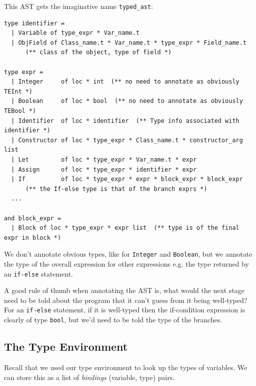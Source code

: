 {{This AST gets the imaginative name \texttt{typed\_ast}:

%

\begin{lstlisting}[caption={typed\_ast.mli},language=caml]
type identifier =
  | Variable of type_expr * Var_name.t
  | ObjField of Class_name.t * Var_name.t * type_expr * Field_name.t
      (** class of the object, type of field *)

type expr =
  | Integer     of loc * int  (** no need to annotate as obviously TEInt *)
  | Boolean     of loc * bool  (** no need to annotate as obviously TEBool *)
  | Identifier  of loc * identifier  (** Type info associated with identifier *)
  | Constructor of loc * type_expr * Class_name.t * constructor_arg list
  | Let         of loc * type_expr * Var_name.t * expr
  | Assign      of loc * type_expr * identifier * expr
  | If          of loc * type_expr * expr * block_expr * block_expr
      (** the If-else type is that of the branch exprs *)
  ...

and block_expr =
  | Block of loc * type_expr * expr list  (** type is of the final expr in block *)
\end{lstlisting}

We don't annotate obvious types, like for \texttt{Integer} and
\texttt{Boolean}, but we annotate the type of the overall expression for
other expressions e.g. the type returned by an \texttt{if-else}
statement.

A good rule of thumb when annotating the AST is, what would the next
stage need to be told about the program that it can't guess from it
being well-typed? For an \texttt{if-else} statement, if it is well-typed
then the if-condition expression is clearly of type \texttt{bool}, but
we'd need to be told the type of the branches.

\hypertarget{the-type-environment}{%
\subsection{\texorpdfstring{\protect\hyperlink{the-type-environment}{}The
Type Environment}{The Type Environment}}\label{the-type-environment}}

Recall that we used our type environment {{}} to
look up the types of variables. We can store this as a list of
\emph{bindings} (variable, type) pairs.

}}
